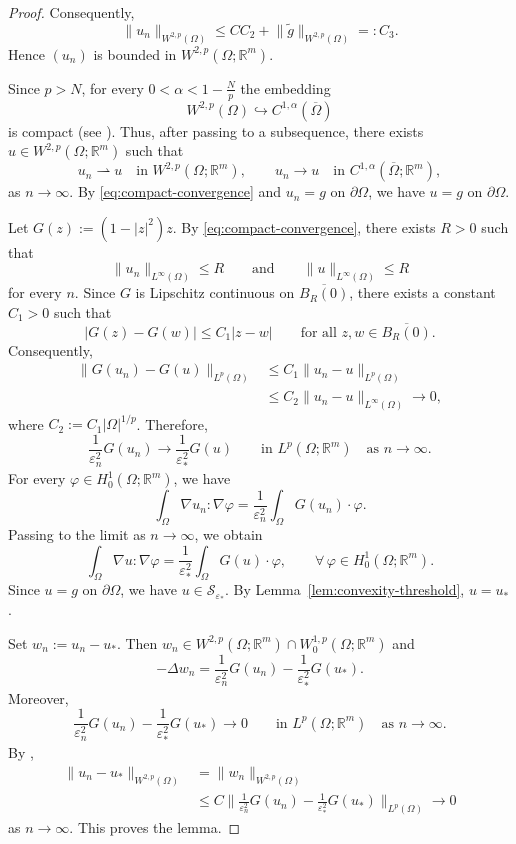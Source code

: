 \documentclass[11pt]{amsart}
\theoremstyle{definition}
\theoremstyle{plain}
\newcommand{\abs}[1]{\lvert#1\rvert}
\newcommand{\norm}[1]{\lVert#1\rVert}
\newcommand{\R}{\mathbb{R}}
\numberwithin{equation}{section}
\begin{document}
\begin{proof}
	Consequently,
	\[
	\norm{u_n}_{W^{2,p}(\Omega)}
	\leq
	CC_2+\norm{\widetilde g}_{W^{2,p}(\Omega)}
	=:C_3.
	\]
	Hence $(u_n)$ is bounded in $W^{2,p}(\Omega;\R^m)$.
	

Since $p>N$, for every $0<\alpha<1-\frac{N}{p}$ the embedding
	\[
	W^{2,p}(\Omega)\hookrightarrow
	C^{1,\alpha}(\overline{\Omega})
	\]
	is compact (see \cite[Theorem~7.26(ii)]{GilbargTrudinger2001}).
	Thus, after passing to a subsequence, there exists
	$u\in W^{2,p}(\Omega;\R^m)$ such that
	\begin{equation}\label{eq:compact-convergence}
	u_n\rightharpoonup u
	\quad\text{in }W^{2,p}(\Omega;\R^m),
	\qquad
	u_n\to u
	\quad\text{in }C^{1,\alpha}(\overline{\Omega};\R^m),
	\end{equation}
	as $n\to\infty$. By \eqref{eq:compact-convergence} and
	$u_n=g$ on $\partial\Omega$, we have $u=g$ on $\partial\Omega$.
	
	Let $G(z):=(1-\abs{z}^2)z$. By
	\eqref{eq:compact-convergence}, there exists $R>0$ such that
	\[
	\norm{u_n}_{L^\infty(\Omega)}\leq R
	\qquad\text{and}\qquad
	\norm{u}_{L^\infty(\Omega)}\leq R
	\]
	for every $n$. Since $G$ is Lipschitz continuous on
	$\overline{B_R(0)}$, there exists a constant $C_1>0$ such that
	\[
	\abs{G(z)-G(w)}
	\leq C_1\abs{z-w}
	\qquad
	\text{for all }z,w\in\overline{B_R(0)}.
	\]
	Consequently,
	\[
	\begin{aligned}
		\norm{G(u_n)-G(u)}_{L^p(\Omega)}
		&\leq C_1\norm{u_n-u}_{L^p(\Omega)}\\
		&\leq C_2\norm{u_n-u}_{L^\infty(\Omega)}
		\longrightarrow0,
	\end{aligned}
	\]
	where $C_2:=C_1\abs{\Omega}^{1/p}$.
	Therefore,
	\[
	\frac{1}{\varepsilon_n^2}G(u_n)
	\to
	\frac{1}{\varepsilon_*^2}G(u)
	\qquad\text{in }L^p(\Omega;\R^m)
	\quad\text{as }n\to\infty.
	\]
For every $\varphi\in H_0^1(\Omega;\R^m)$, we have
\[
\int_\Omega
\nabla u_n:\nabla\varphi
=
\frac{1}{\varepsilon_n^2}
\int_\Omega G(u_n)\cdot\varphi.
\]
Passing to the limit as $n\to\infty$, we obtain
\[
\int_\Omega
\nabla u:\nabla\varphi
=
\frac{1}{\varepsilon_*^2}
\int_\Omega G(u)\cdot\varphi,
\qquad
\forall\,\varphi\in H_0^1(\Omega;\R^m).
\]
	Since $u=g$ on $\partial\Omega$, we have
	$u\in\mathcal{S}_{\varepsilon_*}$. By
	Lemma~\ref{lem:convexity-threshold}, $u=u_*$.
	
	Set $w_n:=u_n-u_*$. Then
	$w_n\in W^{2,p}(\Omega;\R^m)\cap
	W_0^{1,p}(\Omega;\R^m)$ and
	\[
	-\Delta w_n
	=
	\frac{1}{\varepsilon_n^2}G(u_n)
	-
	\frac{1}{\varepsilon_*^2}G(u_*).
	\]
	Moreover,
	\[
	\frac{1}{\varepsilon_n^2}G(u_n)
	-
	\frac{1}{\varepsilon_*^2}G(u_*)
	\to0
	\qquad\text{in }L^p(\Omega;\R^m)
	\quad\text{as }n\to\infty.
	\]
	By \cite[Lemma~9.17]{GilbargTrudinger2001},
	\[
	\begin{aligned}
		\norm{u_n-u_*}_{W^{2,p}(\Omega)}
		&=
		\norm{w_n}_{W^{2,p}(\Omega)}\\
		&\leq
		C
		\norm{
			\frac{1}{\varepsilon_n^2}G(u_n)
			-
			\frac{1}{\varepsilon_*^2}G(u_*)
		}_{L^p(\Omega)}
		\longrightarrow0
	\end{aligned}
	\]
	as $n\to\infty$.
	This proves the lemma.
\end{proof}
\end{document}
